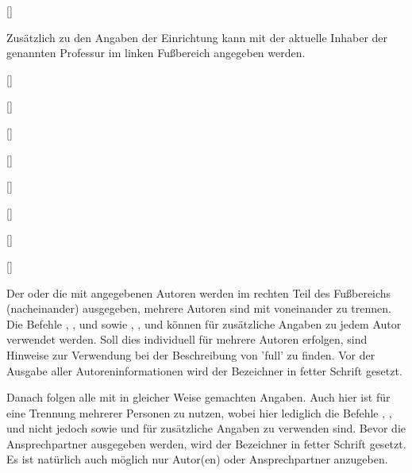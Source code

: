 \begin{DeclareEntity}{}
\begin{Declaration}
  {[]}
\printdeclarationlist

Zusätzlich zu den Angaben der Einrichtung kann mit  der 
aktuelle Inhaber der genannten Professur im linken Fußbereich angegeben werden.
\end{Declaration}

\begin{Declaration}
  {[]}
\begin{Declaration}
  {[]}
\begin{Declaration}
  {[]}
\begin{Declaration}
  {[]}
\begin{Declaration}
  {[]}
\begin{Declaration}
  {[]}
\begin{Declaration}
  {[]}
\begin{Declaration}
  {[]}
\printdeclarationlist

Der oder die mit  angegebenen Autoren werden im rechten Teil des 
Fußbereichs (nacheinander) ausgegeben, mehrere Autoren sind mit  
voneinander zu trennen. Die Befehle , , 
 und  sowie , , 
und  können für zusätzliche Angaben zu jedem Autor verwendet 
werden. Soll dies individuell für mehrere Autoren erfolgen, sind Hinweise zur 
Verwendung bei der Beschreibung von 'full' zu finden. Vor der 
Ausgabe aller Autoreninformationen wird der Bezeichner  in 
fetter Schrift gesetzt. 

Danach folgen alle mit  in gleicher Weise gemachten 
Angaben. Auch hier ist  für eine Trennung mehrerer Personen zu 
nutzen, wobei hier lediglich die Befehle , , 
 und  nicht jedoch  sowie 
 und  für zusätzliche Angaben zu verwenden 
sind. Bevor die Ansprechpartner ausgegeben werden, wird der Bezeichner 
 in fetter Schrift gesetzt. Es ist natürlich auch 
möglich nur Autor(en) oder Ansprechpartner anzugeben.
\end{Declaration}
\end{Declaration}
\end{Declaration}
\end{Declaration}
\end{Declaration}
\end{Declaration}
\end{Declaration}
\end{Declaration}


\end{DeclareEntity}
